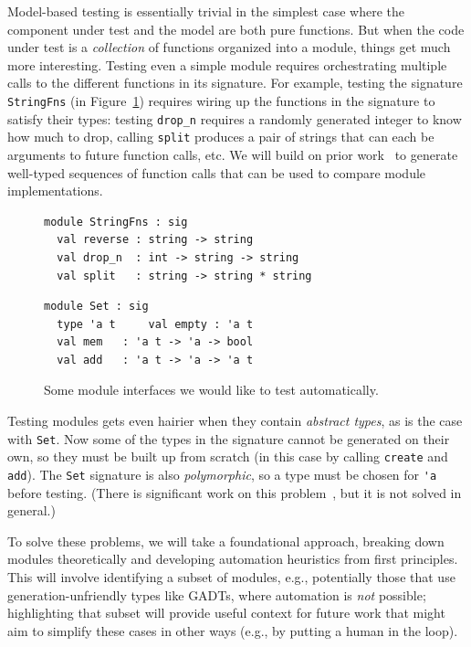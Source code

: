 Model-based testing is essentially trivial in the simplest case where
the component under test and the model are both pure functions.  But
when the code under test is a {\em
  collection} of functions
organized into a module, things get much more interesting. Testing even a simple
module requires orchestrating multiple calls to the different functions in
its signature. For example, testing the signature \lstinline{StringFns} (in
Figure~\ref{fig:sigs}) requires wiring up the functions in the
signature to satisfy their types: testing \lstinline{drop_n} requires a randomly generated
integer to know how much to drop, calling \lstinline{split} produces a pair of strings
that can each be arguments to future function calls, etc. We will build on prior
work~\cite{hughes_experiences_2016} to generate well-typed sequences of function
calls that can be used to compare module implementations.

\begin{figure}[t]
  \begin{minipage}{.45\textwidth}
\begin{lstlisting}
module StringFns : sig
  val reverse : string -> string
  val drop_n  : int -> string -> string
  val split   : string -> string * string
\end{lstlisting}
  \end{minipage}
  \qquad\qquad
  \begin{minipage}{.45\textwidth}
\begin{lstlisting}
module Set : sig
  type 'a t     val empty : 'a t
  val mem   : 'a t -> 'a -> bool
  val add   : 'a t -> 'a -> 'a t
\end{lstlisting}
  \end{minipage}
  \vspace{-2mm}
  \caption{Some module interfaces we would like to test
    automatically.}\label{fig:sigs}
\end{figure}

Testing modules gets even hairier when they contain {\em abstract types}, as is
the case with \lstinline{Set}. Now some of the types in the signature cannot be
generated on their own, so they must be built up from scratch (in this case by
calling \lstinline{create} and \lstinline{add}). The \lstinline{Set} signature is
also {\em polymorphic}, so a type must be chosen for \lstinline{'a} before
testing. (There is significant work on this
problem~\cite{hou_favonia_logarithm_2022}, but it is not solved in general.)

To solve these problems, we will take a foundational approach, breaking down
modules theoretically and developing automation heuristics from first
principles. This will involve identifying a subset of modules, e.g., potentially
those that use generation-unfriendly types like GADTs, where automation is {\em
not} possible; highlighting that subset will provide useful context for future
work that might aim to simplify these cases in other ways (e.g., by putting a
human in the loop).

